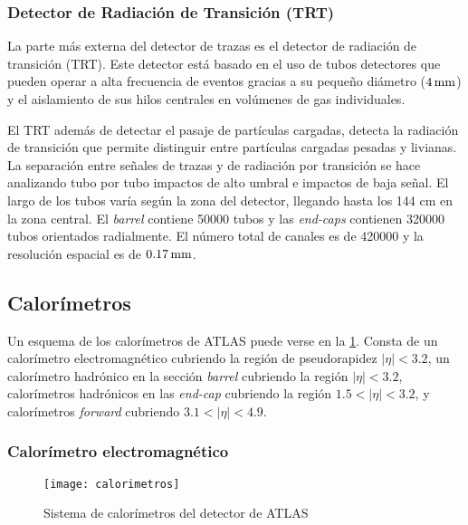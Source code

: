 \subsubsection{Detector de Radiación de Transición (TRT)}

La parte más externa del detector de trazas es el detector de radiación de
transición (TRT). Este detector está basado en el uso de tubos detectores que
pueden operar a alta frecuencia de eventos gracias a su pequeño diámetro ($\unit[4]{mm}$) y
el aislamiento de sus hilos centrales en volúmenes de gas individuales.

El TRT además de detectar el pasaje de partículas cargadas, detecta la radiación
de transición que permite distinguir entre partículas cargadas pesadas y
livianas. La separación entre señales de trazas y de radiación por transición se
hace analizando tubo por tubo impactos de alto umbral e impactos de baja señal.
El largo de los tubos varía según la zona del detector, llegando hasta los 144
cm en la zona central. El \emph{barrel} contiene 50000 tubos y las
\emph{end-caps} contienen 320000 tubos orientados radialmente. El número total
de canales es de 420000 y la resolución espacial es de $\unit[0.17]{mm}$.


\subsection{Calorímetros}

Un esquema de los calorímetros de ATLAS puede verse en la \cref{fig:calorimetros}.
Consta de un calorímetro electromagnético cubriendo la región de pseudorapidez
$|\eta| < 3.2$, un calorímetro hadrónico en la sección \emph{barrel} cubriendo
la región $|\eta| < 3.2$, calorímetros hadrónicos en las \emph{end-cap} cubriendo
la región $1.5 < |\eta| < 3.2$, y calorímetros \emph{forward} cubriendo $3.1 < |\eta| < 4.9$.


\subsubsection{Calorímetro electromagnético}

\begin{figure}[!p]
  \centering

  \texttt{[image: calorimetros]}

  \caption{Sistema de calorímetros del detector de ATLAS}
  \label{fig:calorimetros}

\end{figure}

